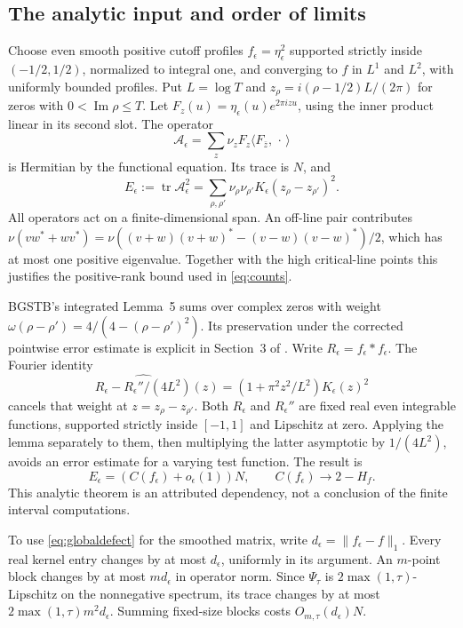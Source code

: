 \documentclass[11pt]{article}
\newcommand{\tr}{\operatorname{tr}}
\theoremstyle{remark}\newtheorem{remark}[theorem]{Remark}
\begin{document}
\subsection{The analytic input and order of limits}
Choose even smooth positive cutoff profiles $f_\epsilon=\eta_\epsilon^2$
supported strictly inside $(-1/2,1/2)$, normalized to integral one, and
converging to $f$ in $L^1$ and $L^2$, with uniformly bounded profiles.
Put $L=\log T$ and
$z_\rho=i(\rho-1/2)L/(2\pi)$ for zeros with $0<\operatorname{Im}\rho\le T$.
Let $F_z(u)=\eta_\epsilon(u)e^{2\pi izu}$, using the inner product linear
in its second slot. The operator
\[
 \mathcal A_\epsilon=
 \sum_z\nu_z F_z\langle F_{\bar z},\,\cdot\,\rangle
\]
is Hermitian by the functional equation. Its trace is $N$, and
\[
 E_\epsilon:=\tr\mathcal A_\epsilon^2
 =\sum_{\rho,\rho'}\nu_\rho\nu_{\rho'}
 K_\epsilon(z_\rho-z_{\rho'})^2.
\]
All operators act on a finite-dimensional span. An off-line pair contributes
$\nu(vw^*+wv^*)=\nu((v+w)(v+w)^*-(v-w)(v-w)^*)/2$, which has at most one
positive eigenvalue. Together with the high critical-line points this
justifies the positive-rank bound used in \eqref{eq:counts}.

BGSTB's integrated Lemma~5 \cite{bgstb} sums over complex zeros with weight
$\omega(\rho-\rho')=4/(4-(\rho-\rho')^2)$. Its preservation under the
corrected pointwise error estimate is explicit in Section~3 of
\cite{correction}. Write $R_\epsilon=f_\epsilon*f_\epsilon$. The Fourier
identity
\[
 \widehat{R_\epsilon-R_\epsilon''/(4L^2)}(z)
 =(1+\pi^2z^2/L^2)K_\epsilon(z)^2
\]
cancels that weight at $z=z_\rho-z_{\rho'}$.
Both $R_\epsilon$ and $R_\epsilon''$ are fixed real even integrable
functions, supported strictly inside $[-1,1]$ and Lipschitz at zero.
Applying the lemma separately to them, then multiplying the latter
asymptotic by $1/(4L^2)$, avoids an error estimate for a varying test function.
The result is
\begin{equation}\label{eq:analytic}
 E_\epsilon=(C(f_\epsilon)+o_\epsilon(1))N,
 \qquad C(f_\epsilon)\longrightarrow 2-H_f.
\end{equation}
This analytic theorem is an attributed dependency, not a conclusion of
the finite interval computations.

To use \eqref{eq:globaldefect} for the smoothed matrix, write
$d_\epsilon=\|f_\epsilon-f\|_1$. Every real kernel entry changes by at
most $d_\epsilon$, uniformly in its argument. An $m$-point block changes
by at most $m d_\epsilon$ in operator norm. Since $\Psi_\tau$ is
$2\max(1,\tau)$-Lipschitz on the nonnegative spectrum, its trace changes
by at most $2\max(1,\tau)m^2d_\epsilon$. Summing fixed-size blocks costs
$O_{m,\tau}(d_\epsilon)N$.
\end{document}
